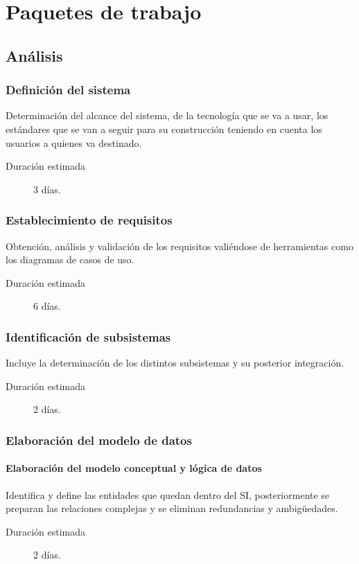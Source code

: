 \documentclass[11pt,a4paper,spanish,twoside]{report}
\begin{document}
\chapter{Paquetes de trabajo}
\section{Análisis}
\subsection{Definición del sistema}
Determinación del alcance del sistema, de la tecnología que se va a usar, los
estándares que se van a seguir para su  construcción teniendo en cuenta los
usuarios a quienes va destinado.
\begin{description}
\item[Duración estimada] 3 días.
\end{description}

\subsection{Establecimiento de requisitos}
Obtención, análisis y validación de los requisitos valiéndose de herramientas
como los diagramas de casos de uso.
\begin{description}
\item[Duración estimada] 6 días.
\end{description}

\subsection{Identificación de subsistemas}
Incluye la determinación de los distintos subsistemas y su posterior
integración.
\begin{description}
\item[Duración estimada] 2 días.
\end{description}

\subsection{Elaboración del modelo de datos}
\subsubsection{Elaboración del modelo conceptual y lógica de datos}
Identifica y define las entidades que quedan dentro del SI, posteriormente se
preparan las relaciones complejas y se eliminan redundancias y ambigüedades. 
\begin{description}
\item[Duración estimada] 2 días.
\end{description}
\end{document}
